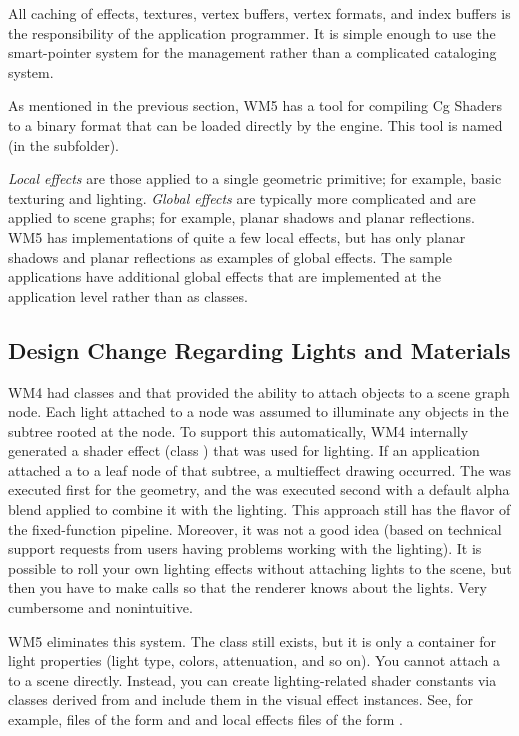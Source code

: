 \documentclass{article}
\begin{document}
All caching of effects, textures, vertex buffers, vertex formats, and index buffers
is the responsibility of the application programmer.  It is simple enough to use
the smart-pointer system for the management rather than a complicated cataloging
system.

As mentioned in the previous section, WM5 has a tool for compiling Cg Shaders
to a binary format that can be loaded directly by the engine.  This tool is
named  (in the  subfolder).

{\em Local effects} are those applied to a single geometric primitive; for
example, basic texturing and lighting.  {\em Global effects} are typically more
complicated and are applied to scene graphs; for example, planar shadows and
planar reflections.  WM5 has implementations of quite a few local effects, but
has only planar shadows and planar reflections as examples of global effects.
The sample applications have additional global effects that are implemented at
the application level rather than as classes.

\subsection{Design Change Regarding Lights and Materials}
\label{subsec.designchangelights}

WM4 had classes  and  that provided the ability to
attach  objects to a scene graph node.  Each light attached to a
node was assumed to illuminate any objects in the subtree rooted at the node.
To support this automatically, WM4 internally generated a shader effect
(class ) that was used for lighting.  If an application
attached a  to a leaf node of that subtree, a multieffect
drawing occurred.  The  was executed first for
the geometry, and the  was executed second with a default
alpha blend applied to combine it with the lighting.  This approach still
has the flavor of the fixed-function pipeline.  Moreover, it was not a good
idea (based on technical support requests from users having problems working
with the lighting).  It is possible to roll your own lighting effects without
attaching lights to the scene, but then you have to make  calls
so that the renderer knows about the lights.  Very cumbersome and nonintuitive.

WM5 eliminates this system.  The  class still exists, but it is
only a container for light properties (light type, colors, attenuation, and
so on).  You cannot attach a  to a scene directly.  Instead, you
can create lighting-related shader constants via classes derived from
 and include them in the visual effect instances.  See,
for example, files of the form  and
 and local effects files of the form
.
\end{document}

